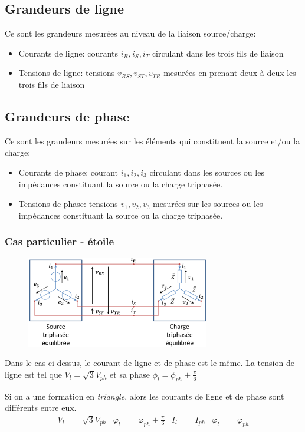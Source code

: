\documentclass{report}
\begin{document}
\subsection{Grandeurs de ligne}
Ce sont les grandeurs mesurées au niveau de la liaison source/charge:
\begin{itemize}
\item Courants de ligne: courants $i_R, i_S, i_T$ circulant dans les trois fils de liaison
\item Tensions de ligne: tensions $v_{RS}, v_{ST}, v_{TR}$ mesurées en prenant deux à deux les trois fils de liaison 
\end{itemize}

\subsection{Grandeurs de phase}
Ce sont les grandeurs mesurées sur les éléments qui constituent la source et/ou la charge:
\begin{itemize}
\item Courants de phase: courant $i_1, i_2, i_3$ circulant dans les sources ou les impédances constituant la source ou la charge triphasée.
\item Tensions de phase: tensions $v_1, v_2, v_3$ mesurées sur les sources ou les impédances constituant la source ou la charge triphasée.
\end{itemize}

\subsubsection{Cas particulier - étoile}
\begin{figure}[H]
\centering
\includegraphics[width=8cm]{img/etoilesetoiles.png}
\end{figure}
Dans le cas ci-dessus, le courant de ligne et de phase est le même. La tension de ligne est tel que $V_l = \sqrt{3}V_{ph}$ et sa phase $\phi_l = \phi_{ph} + \frac{\pi}{6}$\par
Si on a une formation en \textit{triangle}, alors les courants de ligne et de phase sont différents entre eux.
\begin{align*}
V_l &= \sqrt{3} V_{ph} & \varphi_l &= \varphi_{ph} + \frac{\pi}{6} & I_l &= I_{ph} & \varphi_l &= \varphi_{ph}
\end{align*}
\end{document}
